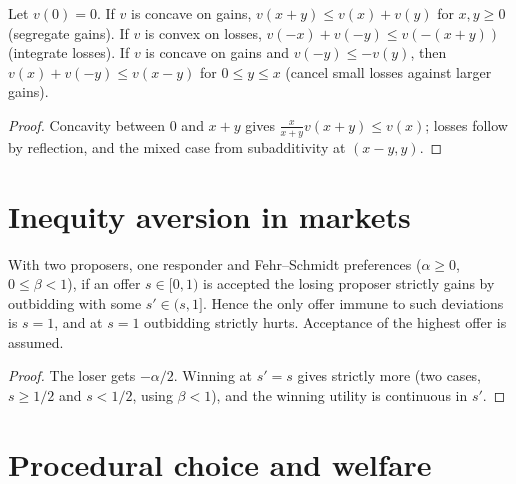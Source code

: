 \begin{theorem}
\label{thm:beh-mental}
\leanok
Let $v(0)=0$. If $v$ is concave on gains, $v(x+y)\le v(x)+v(y)$ for $x,y\ge0$ (segregate gains). If $v$ is convex on
losses, $v(-x)+v(-y)\le v(-(x+y))$ (integrate losses). If $v$ is concave on gains and $v(-y)\le-v(y)$, then
$v(x)+v(-y)\le v(x-y)$ for $0\le y\le x$ (cancel small losses against larger gains).
\end{theorem}
\begin{proof}
\leanok
Concavity between $0$ and $x+y$ gives $\frac{x}{x+y}v(x+y)\le v(x)$; losses follow by reflection, and the mixed case
from subadditivity at $(x-y,y)$.
\end{proof}

\section{Inequity aversion in markets}

\begin{theorem}
\label{thm:beh-fs-market}
\leanok
With two proposers, one responder and Fehr--Schmidt preferences ($\alpha\ge0$, $0\le\beta<1$), if an offer
$s\in[0,1)$ is accepted the losing proposer strictly gains by outbidding with some $s'\in(s,1]$. Hence the only offer
immune to such deviations is $s=1$, and at $s=1$ outbidding strictly hurts. Acceptance of the highest offer is assumed.
\end{theorem}
\begin{proof}
\leanok
The loser gets $-\alpha/2$. Winning at $s'=s$ gives strictly more (two cases, $s\ge1/2$ and $s<1/2$, using
$\beta<1$), and the winning utility is continuous in $s'$.
\end{proof}


\section{Procedural choice and welfare}

